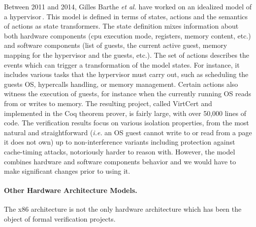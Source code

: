Between 2011 and 2014, Gilles Barthe \emph{et al.} have worked on an idealized
model of a
hypervisor\,\cite{barthe2011virtcert1,barthe2012virtcert2,barthe2014virtcert3}.
%
This model is defined in terms of states, actions and the semantics of actions
as state trans\-formers.
%
The state definition mixes information about both hardware components (\ac{cpu}
execution mode, registers, memory content, etc.) and software components (list
of guests, the current active guest, memory mapping for the hypervisor and the
guests, etc.).
%
The set of actions describes the events which can trigger a transformation of
the model states.
%
For instance, it includes various tasks that the hypervisor must carry out, such
as scheduling the guests OS, hypercalls handling, or memory management.
%
Certain actions also witness the execution of guests, for instance when the
currently running OS reads from or writes to memory.
%
The resulting project, called VirtCert and implemented in the Coq theorem
prover, is fairly large, with over 50,000 lines of code.
%
The verification results focus on various isolation properties, from the most
natural and straightforward (\emph{i.e.} an OS guest cannot write to or read
from a page it does not own) up to non-interference variants including
protection against cache-timing attacks, notoriously harder to reason with.
%
However, the model combines hardware and software components behavior and we
would have to make significant changes prior to using it.

\paragraph{Other Hardware Architecture Models.}
%
The x86 architecture is not the only hardware architecture which has been the
object of formal verification projects.


